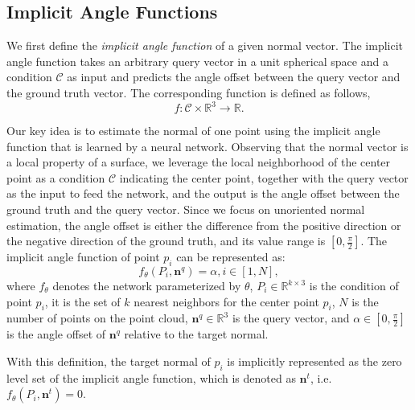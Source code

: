 \documentclass[letterpaper]{article} \usepackage{aaai23}  \usepackage{times}  \usepackage{helvet}  \usepackage{courier}  \usepackage[hyphens]{url}  \usepackage{graphicx} \urlstyle{rm} \def\UrlFont{\rm}  \usepackage{natbib}  \usepackage{caption} \frenchspacing  \setlength{\pdfpagewidth}{8.5in} \setlength{\pdfpageheight}{11in} \usepackage{algorithm}
\begin{document}
\subsection{Implicit Angle Functions}
We first define the \emph{implicit angle function} of a given normal vector. The implicit angle function takes an arbitrary query vector in a unit spherical space and a condition $\mathcal{C}$ as input and predicts the angle offset between the query vector and the ground truth vector. The corresponding function is defined as follows,
\begin{equation}
\label{eq:definition of angle function}
f: \mathcal{C} \times \mathbb{R}^3   \to \mathbb{R}.
\end{equation}

Our key idea is to estimate the normal of one point using the implicit angle function that is learned by a neural network. Observing that the normal vector is a local property of a surface, we leverage the local neighborhood of the center point as a condition $\mathcal{C}$ indicating the center point, together with the query vector as the input to feed the network, and the output is the angle offset between the ground truth and the query vector. Since we focus on unoriented normal estimation, the angle offset is either the difference from the positive direction or the negative direction of the ground truth, and its value range is $[0, \frac{\pi}{2}]$. The implicit angle function of point $p_i$ can be represented as:
\begin{equation}
\label{eq:angle function for network}
f_\theta(P_i, \boldsymbol{n}^q) = \alpha, i \in [1,N],
\end{equation}
where $f_\theta$ denotes the network parameterized by $\theta$,  $P_i \in \mathbb{R}^{k \times 3}$ is the condition of point $p_i$, it is the set of $k$ nearest neighbors for the center point $p_i$, $N$ is the number of points on the point cloud, $\boldsymbol{n}^q \in \mathbb{R}^3$ is the query vector, and $\alpha  \in [0, \frac{\pi}{2}]$ is the angle offset of $\boldsymbol{n}^q$ relative to the target normal. 

With this definition, the target normal of $p_i$ is implicitly represented as the zero level set of the implicit angle function, which is denoted as $\boldsymbol{n}^{t}$, i.e.  $f_\theta(P_i, \boldsymbol{n}^{t}) = 0$. 
\end{document}
